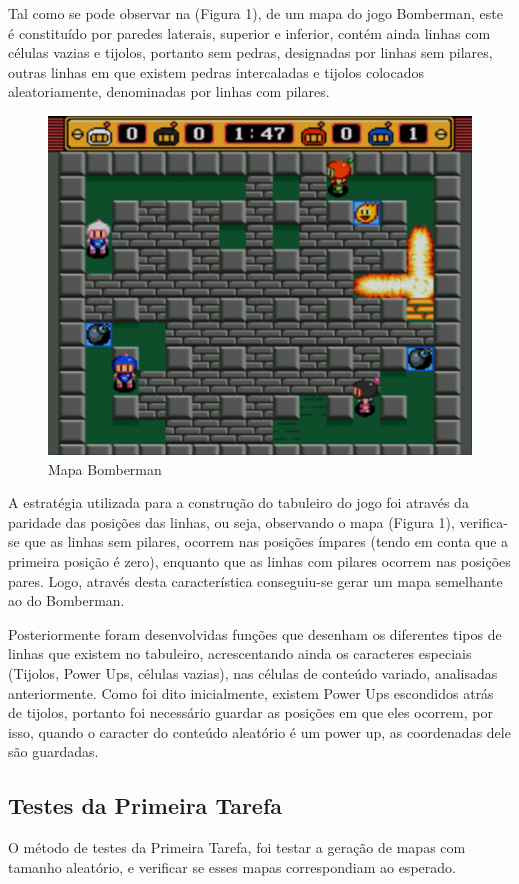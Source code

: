 \documentclass[4apaper]{report}
\begin{document}
Tal como se pode observar na (Figura 1), de um mapa do jogo Bomberman, este é constituído por paredes laterais, superior e inferior, contém ainda linhas com células vazias e tijolos, portanto sem pedras, designadas por linhas sem pilares, outras linhas em que existem pedras intercaladas e tijolos colocados aleatoriamente, denominadas por linhas com pilares. 

\begin{figure}[ht]
	\centering
	\includegraphics[scale=1.5]{tabuleiro.jpg}
	\caption{Mapa Bomberman}
	\label{img:mapa}
\end{figure}

A estratégia utilizada para a construção do tabuleiro do jogo foi através da paridade das posições das linhas, ou seja, observando o mapa (Figura 1), verifica-se que as linhas sem pilares, ocorrem nas posições ímpares (tendo em conta que a primeira posição é zero), enquanto que as linhas com pilares ocorrem nas posições pares. Logo, através desta característica conseguiu-se gerar um mapa semelhante ao do Bomberman. 

Posteriormente foram desenvolvidas funções que desenham os diferentes tipos de linhas que existem no tabuleiro, acrescentando ainda os caracteres especiais (Tijolos, Power Ups, células vazias), nas células de conteúdo variado, analisadas anteriormente. Como foi dito inicialmente, existem Power Ups escondidos atrás de tijolos, portanto foi necessário guardar as posições em que eles ocorrem, por isso, quando o caracter do conteúdo aleatório é um power up, as coordenadas dele são guardadas.

\subsection{Testes da Primeira Tarefa}
O método de testes da Primeira Tarefa, foi testar a geração de mapas com tamanho aleatório, e verificar se esses mapas correspondiam ao esperado.
\end{document}
